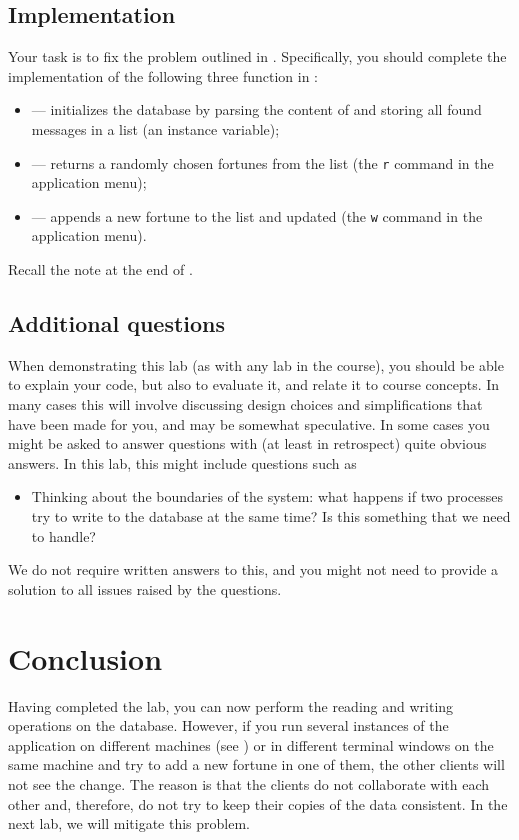 \documentclass[a4paper,10pt]{article}
\begin{document}
\subsection{Implementation}
Your task is to fix the problem outlined in . Specifically,
you should complete the implementation of the following three function in
:
\begin{itemize}

  \item {} --- initializes the database by parsing the content
  of  and storing all found messages in a list (an
  instance variable);

  \item {} --- returns a randomly chosen fortunes from the list (the
  \texttt{r} command in the application menu);

  \item {} --- appends a new fortune to the list and updated
   (the \texttt{w} command in the application menu).

\end{itemize}
Recall the note at the end of .

\subsection{Additional questions}
When demonstrating this lab (as with any lab in the course), you
should be able to explain your code, but also to evaluate it, and
relate it to course concepts. In many cases this will involve
discussing design choices and simplifications that have been made for
you, and may be somewhat speculative. In some cases you might be asked
to answer questions with (at least in retrospect) quite obvious
answers. In this lab, this might include questions such as

\begin{itemize}
  \item Thinking about the boundaries of the system: what happens if
    two processes try to write to the database at the same time? Is
    this something that we need to handle?
\end{itemize}

We do not require written answers to this, and you might not need to
provide a solution to all issues raised by the questions.


\section{Conclusion}
Having completed the lab, you can now perform the reading and writing operations
on the database. However, if you run several instances of the application on
different machines (see ) or in different terminal
windows on the same machine and try to add a new fortune in one of them, the
other clients will not see the change. The reason is that the clients do not
collaborate with each other and, therefore, do not try to keep their copies of
the data consistent. In the next lab, we will mitigate this problem.

\printbibliography
\end{document}

